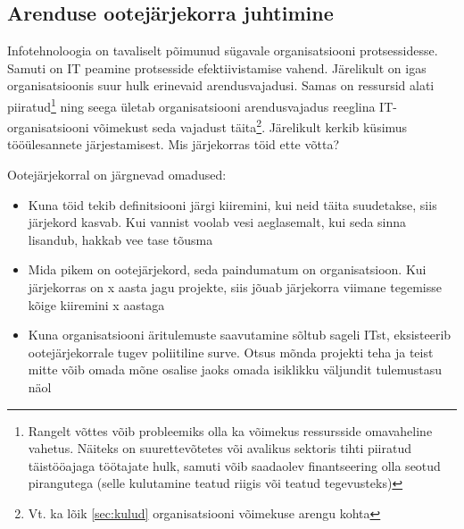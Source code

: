 \subsection{Arenduse ootejärjekorra juhtimine}
Infotehnoloogia on tavaliselt põimunud sügavale organisatsiooni protsessidesse. Samuti on IT peamine protsesside efektiivistamise vahend. Järelikult on igas organisatsioonis suur hulk erinevaid arendusvajadusi. Samas on ressursid alati piiratud\footnote{Rangelt võttes võib probleemiks olla ka võimekus ressursside omavaheline vahetus. Näiteks on suurettevõtetes või avalikus sektoris tihti piiratud täistööajaga töötajate hulk, samuti võib saadaolev finantseering olla seotud pirangutega (selle kulutamine teatud riigis või teatud tegevusteks)} ning seega ületab organisatsiooni arendusvajadus reeglina IT-organisatsiooni võimekust seda vajadust täita\footnote{Vt. ka lõik \ref{sec:kulud} organisatsiooni võimekuse arengu kohta}. Järelikult kerkib küsimus tööülesannete järjestamisest. Mis järjekorras töid ette võtta?

Ootejärjekorral on järgnevad omadused:
\begin{itemize}
	\item Kuna töid tekib definitsiooni järgi kiiremini, kui neid täita suudetakse, siis järjekord kasvab. Kui vannist voolab vesi aeglasemalt, kui seda sinna lisandub, hakkab vee tase tõusma
	\item Mida pikem on ootejärjekord, seda paindumatum on organisatsioon. Kui järjekorras on x aasta jagu projekte, siis jõuab järjekorra viimane tegemisse kõige kiiremini x aastaga
	\item Kuna organisatsiooni äritulemuste saavutamine sõltub sageli ITst, eksisteerib ootejärjekorrale tugev poliitiline surve. Otsus mõnda projekti teha ja teist mitte võib omada mõne osalise jaoks omada isiklikku väljundit tulemustasu näol
\end{itemize}


